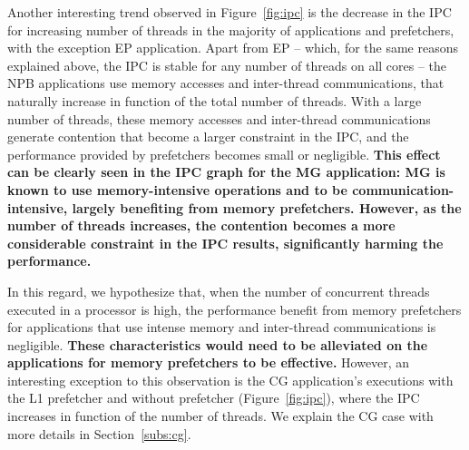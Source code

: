 \documentclass[AMA,final,STIX1COL]{WileyNJD-v2}
\newcommand\new[1]{{\color{red}\textbf{#1}}}
\newcommand{\fbm}[1]{\textcolor{red}{\bfseries \ul{fbm: #1} }\vspace{0.2cm}}
\begin{document}


Another interesting trend observed in Figure~\ref{fig:ipc} is the decrease in the IPC for increasing number of threads in the majority of applications and prefetchers, with the exception EP application.
Apart from EP -- which, for the same reasons explained above, the IPC is stable for any number of threads on all cores -- the NPB applications use memory accesses and inter-thread communications, that naturally increase in function of the total number of threads. 
With a large number of threads, these memory accesses and inter-thread communications generate contention that become a larger constraint in the IPC, and the performance provided by prefetchers becomes small or negligible. %
\new{This effect can be clearly seen in the IPC graph for the MG application: MG is known to use memory-intensive operations and to be communication-intensive, largely benefiting from memory prefetchers. 
However, as the number of threads increases, the contention becomes a more considerable constraint in the IPC results, significantly harming the performance.}

In this regard, we hypothesize that, when the number of concurrent threads executed in a processor is high, the performance benefit from memory prefetchers for applications that use intense memory and inter-thread communications is negligible. 
\new{These characteristics would need to be alleviated on the applications for memory prefetchers to be effective.} 
However, an interesting exception to this observation is the CG application's executions with the L1 prefetcher and without prefetcher (Figure~\ref{fig:ipc}), where the IPC increases in function of the number of threads. 
We explain the CG case with more details in Section~\ref{subs:cg}.
\end{document}
